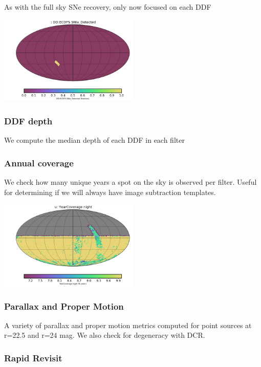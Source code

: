 As with the full sky SNe recovery, only now focused on each DDF

\includegraphics[width=0.5\textwidth]{metric_summary/sci_baseline_v1.4_10yrs/thumb._DD_ECDFS_SNIa_Detected_USER_SkyMap.png}

\subsubsection{DDF depth}

We compute the median depth of each DDF in each filter


\subsubsection{Annual coverage}

We check how many unique years a spot on the sky is observed per filter. Useful for determining if we will always have image subtraction templates.

\includegraphics[width=0.5\textwidth]{metric_summary/sci_baseline_v1.4_10yrs/thumb._YearCoverage_night_u_HEAL_SkyMap.png}

\subsubsection{Parallax and Proper Motion}

A variety of parallax and proper motion metrics computed for point sources at r=22.5 and r=24 mag. We also check for degeneracy with DCR.

\subsubsection{Rapid Revisit}

